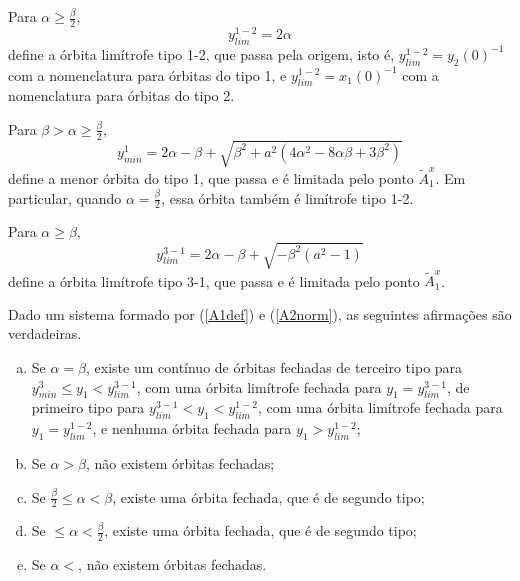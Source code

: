 Para $\alpha\geq\frac{\beta}{2}$,  
\begin{equation}
\label{y_lim_1-2}
y_{lim}^{1-2}=2\alpha
\end{equation}
define a órbita limítrofe tipo 1-2, que passa pela origem, isto é, $y_{lim}^{1-2}=y_2(0)^{-1}$ com a nomenclatura para órbitas do tipo 1, e $y_{lim}^{1-2}=x_1(0)^{-1}$ com a nomenclatura para órbitas do tipo 2.

Para $\beta>\alpha\geq\frac{\beta}{2}$, 
$$
y_{min}^1=2\alpha-\beta + \sqrt{\beta^2 + a^2 (4 \alpha^2 - 8 \alpha \beta + 3 \beta^2)}
$$
define a menor órbita do tipo 1, que passa e é limitada pelo ponto $\tilde{A}^x_1$. Em particular, quando $\alpha=\frac{\beta}{2}$, essa órbita também é limítrofe tipo 1-2. 

Para $\alpha\geq\beta$,
$$y_{lim}^{3-1}=2\alpha-\beta+\sqrt{-\beta^2(a^2-1)}$$
define a órbita limítrofe tipo 3-1, que passa e é limitada pelo ponto $\tilde{A}^x_1$.
\begin{proposition}
\label{propredux}
Dado um sistema formado por (\ref{A1def}) e (\ref{A2norm}), as seguintes afirmações são verdadeiras.
\begin{enumerate}[(a)]
\item Se $\alpha=\beta$, existe um contínuo de órbitas fechadas de terceiro tipo para $ y_{min}^3\leq y_1<y_{lim}^{3-1}$, com uma órbita limítrofe fechada para $y_1=y_{lim}^{3-1}$, de primeiro tipo para $y_{lim}^{3-1}< y_1<y_{lim}^{1-2}$, com uma órbita limítrofe fechada para $y_1=y_{lim}^{1-2}$, e nenhuma órbita fechada para $y_1>y_{lim}^{1-2}$;
\item Se $\alpha>\beta$, não existem órbitas fechadas;
\item Se $\frac{\beta}{2}\leq\alpha<\beta$, existe uma órbita fechada, que é de segundo tipo;
\item Se $\leq\alpha<\frac{\beta}{2}$, existe uma órbita fechada, que é de segundo tipo;
\item Se $\alpha<$, não existem órbitas fechadas.
\end{enumerate}
\end{proposition}
